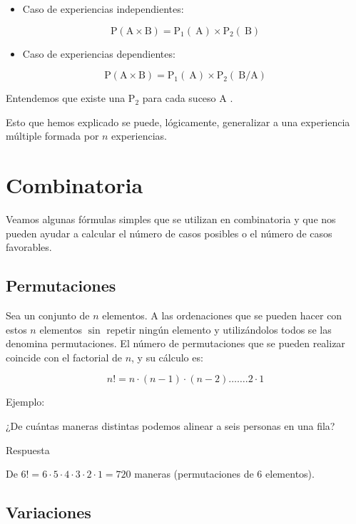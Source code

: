 \documentclass[
  a4paper,
  DIV=11,
  numbers=noendperiod]{scrreprt}
\providecommand{\tightlist}{%
  \setlength{\itemsep}{0pt}\setlength{\parskip}{0pt}}\usepackage{longtable,booktabs,array}
\begin{document}
\begin{itemize}
\tightlist
\item
  Caso de experiencias independientes:
\end{itemize}

\[
\mathrm{P}(\mathrm{A} \times \mathrm{B})=\mathrm{P}_{1}(\mathrm{~A}) \times \mathrm{P}_{2}(\mathrm{~B})
\]

\begin{itemize}
\tightlist
\item
  Caso de experiencias dependientes:
\end{itemize}

\[
\mathrm{P}(\mathrm{A} \times \mathrm{B})=\mathrm{P}_{1}(\mathrm{~A}) \times \mathrm{P}_{2}(\mathrm{~B} / \mathrm{A})
\]

Entendemos que existe una \(\mathrm{P}_{2}\) para cada suceso A .

Esto que hemos explicado se puede, lógicamente, generalizar a una
experiencia múltiple formada por \(n\) experiencias.

\section{Combinatoria}\label{combinatoria}

Veamos algunas fórmulas simples que se utilizan en combinatoria y que
nos pueden ayudar a calcular el número de casos posibles o el número de
casos favorables.

\subsection{Permutaciones}\label{permutaciones}

Sea un conjunto de \(n\) elementos. A las ordenaciones que se pueden
hacer con estos \(n\) elementos \(\sin\) repetir ningún elemento y
utilizándolos todos se las denomina permutaciones. El número de
permutaciones que se pueden realizar coincide con el factorial de \(n\),
y su cálculo es:

\[
n!=n \cdot(n-1) \cdot(n-2) \ldots \ldots .2 \cdot 1
\]

Ejemplo:

¿De cuántas maneras distintas podemos alinear a seis personas en una
fila?

Respuesta

De \(6!=6 \cdot 5 \cdot 4 \cdot 3 \cdot 2 \cdot 1=720\) maneras
(permutaciones de 6 elementos).

\subsection{Variaciones}\label{variaciones}
\end{document}
